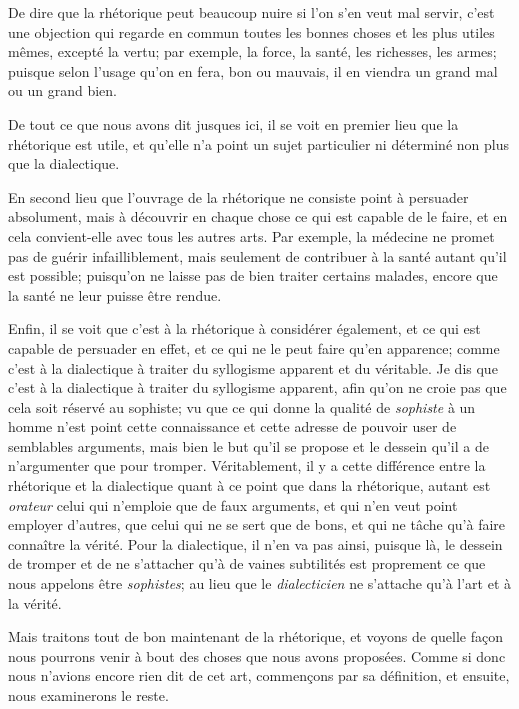 De dire que la rhétorique peut beaucoup nuire si l'on s'en veut mal servir, c'est une objection qui regarde en commun toutes les bonnes choses et les plus
utiles mêmes, excepté la vertu; par exemple, la force, la santé, les richesses, les armes; puisque selon l'usage qu'on en fera, bon ou mauvais, il en viendra
un grand mal ou un grand bien. 

De tout ce que nous avons dit jusques ici, il se voit en premier lieu que la rhétorique est utile, et qu'elle n'a point un sujet particulier ni déterminé non
plus que la dialectique.

En second lieu que l'ouvrage de la rhétorique ne consiste point à persuader absolument, mais à découvrir en chaque chose ce qui est capable de le faire, et en
cela convient-elle avec tous les autres arts. Par exemple, la médecine ne promet pas de guérir infailliblement, mais seulement de contribuer à la santé autant
qu'il est possible; puisqu'on ne laisse pas de bien traiter certains malades, encore que la santé ne leur puisse être rendue.

Enfin, il se voit que c'est à la rhétorique à considérer également, et ce qui est capable de persuader en effet, et ce qui ne le peut faire qu'en apparence;
comme c'est à la dialectique à traiter du syllogisme apparent et du véritable. Je dis que c'est à la dialectique à traiter du syllogisme apparent, afin qu'on
ne croie pas que cela soit réservé au sophiste; vu que ce qui donne la qualité de \emph{sophiste} à un homme n'est point cette connaissance et cette adresse de
pouvoir user de semblables arguments, mais bien le but qu'il se propose et le dessein qu'il a de n'argumenter que pour tromper. Véritablement, il y a cette
différence entre la rhétorique et la dialectique quant à ce point que dans la rhétorique, autant est \emph{orateur} celui qui n'emploie que de faux arguments, et
qui n'en veut point employer d'autres, que celui qui ne se sert que de bons, et qui ne tâche qu'à faire connaître la vérité. Pour la dialectique, il n'en va pas
ainsi, puisque là, le dessein de tromper et de ne s'attacher qu'à de vaines subtilités est proprement ce que nous appelons être \emph{sophistes}; au lieu que le
\emph{dialecticien} ne s'attache qu'à l'art et à la vérité.

Mais traitons tout de bon maintenant de la rhétorique, et voyons de quelle façon nous pourrons venir à bout des choses que nous avons proposées. Comme si donc nous
n'avions encore rien dit de cet art, commençons par sa définition, et ensuite, nous examinerons le reste.

